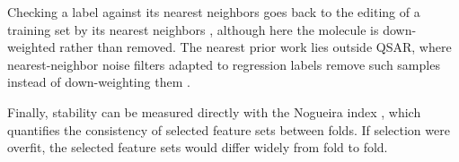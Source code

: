 Checking a label against its nearest neighbors goes back to the editing of a training set by its nearest neighbors \citep{Wilson1972}, although here the molecule is down-weighted rather than removed.
The nearest prior work lies outside QSAR, where nearest-neighbor noise filters adapted to regression labels remove such samples instead of down-weighting them \citep{Martin2021}.

Finally, stability can be measured directly with the Nogueira index \citep{Nogueira2018}, which quantifies the consistency of selected feature sets between folds. If selection were overfit, the selected feature sets would differ widely from fold to fold.

